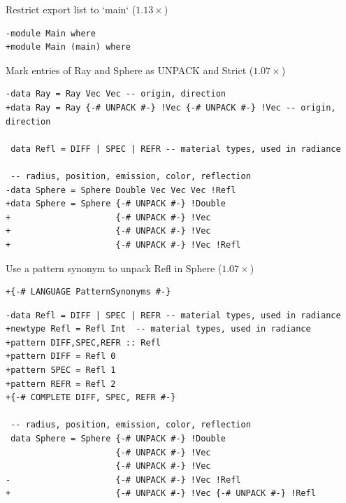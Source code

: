 \documentclass[8pt]{beamer}
\begin{document}
\begin{frame}[fragile]{Restrict export list to `main` ($1.13\times$)}
\begin{verbatim}
-module Main where
+module Main (main) where
\end{verbatim}
\end{frame}


\begin{frame}[fragile]{Mark entries of Ray and Sphere as UNPACK and Strict ($1.07\times$)}

\begin{verbatim}
-data Ray = Ray Vec Vec -- origin, direction
+data Ray = Ray {-# UNPACK #-} !Vec {-# UNPACK #-} !Vec -- origin, direction

 data Refl = DIFF | SPEC | REFR -- material types, used in radiance

 -- radius, position, emission, color, reflection
-data Sphere = Sphere Double Vec Vec Vec !Refl
+data Sphere = Sphere {-# UNPACK #-} !Double 
+                     {-# UNPACK #-} !Vec 
+                     {-# UNPACK #-} !Vec 
+                     {-# UNPACK #-} !Vec !Refl
\end{verbatim}
\end{frame}



\begin{frame}[fragile]{Use a pattern synonym to unpack Refl in Sphere ($1.07\times$)}

\begin{verbatim}
+{-# LANGUAGE PatternSynonyms #-}
\end{verbatim}


\begin{verbatim}
-data Refl = DIFF | SPEC | REFR -- material types, used in radiance
+newtype Refl = Refl Int  -- material types, used in radiance
+pattern DIFF,SPEC,REFR :: Refl
+pattern DIFF = Refl 0
+pattern SPEC = Refl 1
+pattern REFR = Refl 2
+{-# COMPLETE DIFF, SPEC, REFR #-}

 -- radius, position, emission, color, reflection
 data Sphere = Sphere {-# UNPACK #-} !Double 
                      {-# UNPACK #-} !Vec
                      {-# UNPACK #-} !Vec 
-                     {-# UNPACK #-} !Vec !Refl
+                     {-# UNPACK #-} !Vec {-# UNPACK #-} !Refl

 \end{verbatim}
\end{frame}
\end{document}
